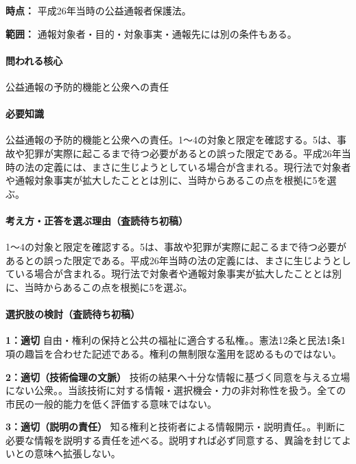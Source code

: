 \noindent\textbf{時点：} 平成26年当時の公益通報者保護法。\par

\noindent\textbf{範囲：} 通報対象者・目的・対象事実・通報先には別の条件もある。\par

\paragraph{問われる核心} 公益通報の予防的機能と公衆への責任

\paragraph{必要知識} 公益通報の予防的機能と公衆への責任。1〜4の対象と限定を確認する。5は、事故や犯罪が実際に起こるまで待つ必要があるとの誤った限定である。平成26年当時の法の定義には、まさに生じようとしている場合が含まれる。現行法で対象者や通報対象事実が拡大したこととは別に、当時からあるこの点を根拠に5を選ぶ。

\paragraph{考え方・正答を選ぶ理由（査読待ち初稿）} 1〜4の対象と限定を確認する。5は、事故や犯罪が実際に起こるまで待つ必要があるとの誤った限定である。平成26年当時の法の定義には、まさに生じようとしている場合が含まれる。現行法で対象者や通報対象事実が拡大したこととは別に、当時からあるこの点を根拠に5を選ぶ。

\paragraph{選択肢の検討（査読待ち初稿）}\mbox{}\par

\noindent\textbf{1：適切} 自由・権利の保持と公共の福祉に適合する私権。。憲法12条と民法1条1項の趣旨を合わせた記述である。権利の無制限な濫用を認めるものではない。\par

\noindent\textbf{2：適切（技術倫理の文脈）} 技術の結果へ十分な情報に基づく同意を与える立場にない公衆。。当該技術に対する情報・選択機会・力の非対称性を扱う。全ての市民の一般的能力を低く評価する意味ではない。\par

\noindent\textbf{3：適切（説明の責任）} 知る権利と技術者による情報開示・説明責任。。判断に必要な情報を説明する責任を述べる。説明すれば必ず同意する、異論を封じてよいとの意味へ拡張しない。\par


